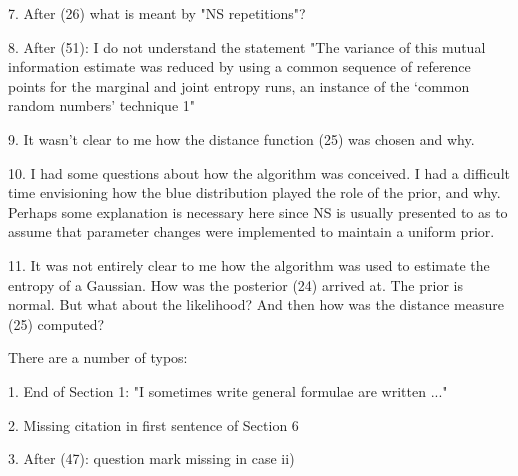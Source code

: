 \documentclass[a4paper, 12pt]{article}
\begin{document}
7. After (26) what is meant by "NS repetitions"?

8. After (51): I do not understand the statement "The variance of this mutual information estimate was reduced by using a common sequence of reference points for the marginal and joint entropy runs, an instance of the ‘common random numbers’ technique 1"

9. It wasn't clear to me how the distance function (25) was chosen and why.

10. I had some questions about how the algorithm was conceived.  I had a difficult time envisioning how the blue distribution played the role of the prior, and why.  Perhaps some explanation is necessary here since NS is usually presented to as to assume that parameter changes were implemented to maintain a uniform prior.

11.  It was not entirely clear to me how the algorithm was used to estimate the entropy of a Gaussian.  How was the posterior (24) arrived at.  The prior is normal.  But what about the likelihood?  And then how was the distance measure (25) computed?



There are a number of typos:

1. End of Section 1: "I sometimes write general formulae are written ..."

2. Missing citation in first sentence of Section 6

3. After (47): question mark missing in case ii)





\end{document}
